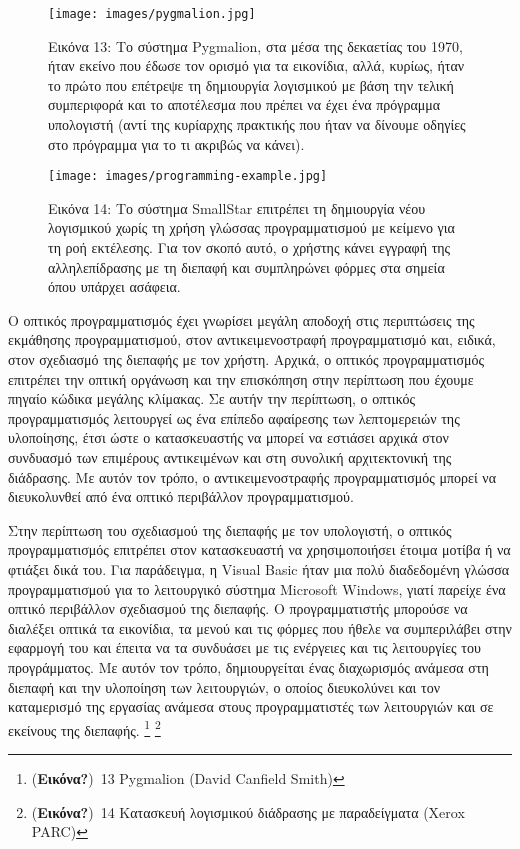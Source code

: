 \documentclass[
]{article}
\begin{document}
\leavevmode{}%
\begin{figure}
\hypertarget{fig:pygmalion}{%
\centering
\texttt{[image: images/pygmalion.jpg]}
\caption{Εικόνα 13: Το σύστημα Pygmalion, στα μέσα της δεκαετίας του
1970, ήταν εκείνο που έδωσε τον ορισμό για τα εικονίδια, αλλά, κυρίως,
ήταν το πρώτο που επέτρεψε τη δημιουργία λογισμικού με βάση την τελική
συμπεριφορά και το αποτέλεσμα που πρέπει να έχει ένα πρόγραμμα
υπολογιστή (αντί της κυρίαρχης πρακτικής που ήταν να δίνουμε οδηγίες στο
πρόγραμμα για το τι ακριβώς να κάνει).}\label{fig:pygmalion}
}
\end{figure}

\leavevmode{}%
\begin{figure}
\hypertarget{fig:programming-example}{%
\centering
\texttt{[image: images/programming-example.jpg]}
\caption{Εικόνα 14: Το σύστημα SmallStar επιτρέπει τη δημιουργία νέου
λογισμικού χωρίς τη χρήση γλώσσας προγραμματισμού με κείμενο για τη ροή
εκτέλεσης. Για τον σκοπό αυτό, ο χρήστης κάνει εγγραφή της
αλληλεπίδρασης με τη διεπαφή και συμπληρώνει φόρμες στα σημεία όπου
υπάρχει ασάφεια.}\label{fig:programming-example}
}
\end{figure}

Ο οπτικός προγραμματισμός έχει γνωρίσει μεγάλη αποδοχή στις περιπτώσεις
της εκμάθησης προγραμματισμού, στον αντικειμενοστραφή προγραμματισμό
και, ειδικά, στον σχεδιασμό της διεπαφής με τον χρήστη. Αρχικά, ο
οπτικός προγραμματισμός επιτρέπει την οπτική οργάνωση και την επισκόπηση
στην περίπτωση που έχουμε πηγαίο κώδικα μεγάλης κλίμακας. Σε αυτήν την
περίπτωση, ο οπτικός προγραμματισμός λειτουργεί ως ένα επίπεδο αφαίρεσης
των λεπτομερειών της υλοποίησης, έτσι ώστε ο κατασκευαστής να μπορεί να
εστιάσει αρχικά στον συνδυασμό των επιμέρους αντικειμένων και στη
συνολική αρχιτεκτονική της διάδρασης. Με αυτόν τον τρόπο, ο
αντικειμενοστραφής προγραμματισμός μπορεί να διευκολυνθεί από ένα οπτικό
περιβάλλον προγραμματισμού.

Στην περίπτωση του σχεδιασμού της διεπαφής με τον υπολογιστή, ο οπτικός
προγραμματισμός επιτρέπει στον κατασκευαστή να χρησιμοποιήσει έτοιμα
μοτίβα ή να φτιάξει δικά του. Για παράδειγμα, η Visual Basic ήταν μια
πολύ διαδεδομένη γλώσσα προγραμματισμού για το λειτουργικό σύστημα
Microsoft Windows, γιατί παρείχε ένα οπτικό περιβάλλον σχεδιασμού της
διεπαφής. Ο προγραμματιστής μπορούσε να διαλέξει οπτικά τα εικονίδια, τα
μενού και τις φόρμες που ήθελε να συμπεριλάβει στην εφαρμογή του και
έπειτα να τα συνδυάσει με τις ενέργειες και τις λειτουργίες του
προγράμματος. Με αυτόν τον τρόπο, δημιουργείται ένας διαχωρισμός ανάμεσα
στη διεπαφή και την υλοποίηση των λειτουργιών, ο οποίος διευκολύνει και
τον καταμερισμό της εργασίας ανάμεσα στους προγραμματιστές των
λειτουργιών και σε εκείνους της διεπαφής. \footnote{(\textbf{Εικόνα?})~13
  Pygmalion (David Canfield Smith)} \footnote{(\textbf{Εικόνα?})~14
  Κατασκευή λογισμικού διάδρασης με παραδείγματα (Xerox PARC)}
\end{document}

